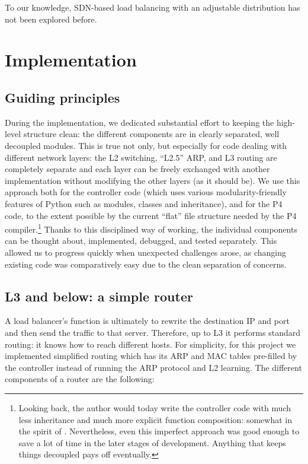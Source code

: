 \documentclass[11pt,oneside,a4paper]{article}
\begin{document}
To our knowledge, SDN-based load balancing with an adjustable distribution has
not been explored before.

\section{Implementation}
\subsection{Guiding principles}
During the implementation, we dedicated substantial effort to keeping the
high-level structure clean: the different components are in clearly separated,
well decoupled modules.
This is true not only, but especially for code dealing with different network
layers: the L2 switching, ``L2.5'' ARP, and L3 routing are completely separate and
each layer can be freely exchanged with another implementation without modifying
the other layers (as it should be).
We use this approach both for the controller code (which uses various
modularity-friendly features of Python such as modules, classes and
inheritance), and for the P4 code, to the extent possible by the current
``flat'' file structure needed by the P4 compiler.\footnote{%
Looking back, the author would today write the controller code with much less
inheritance and much more explicit function composition: somewhat in the
spirit of \cite{inheritance}.
Nevertheless, even this imperfect approach was good enough to save a lot of time
in the later stages of development.
Anything that keeps things decoupled pays off eventually.%
}
Thanks to this disciplined way of working, the individual components can be
thought about, implemented, debugged, and tested separately.
This allowed us to progress quickly when unexpected challenges arose, as
changing existing code was comparatively easy due to the clean separation of
concerns.

\subsection{L3 and below: a simple router}
A load balancer's function is ultimately to rewrite the destination IP and port
and then send the traffic to that server.
Therefore, up to L3 it performs standard routing: it knows how to reach
different hosts.
For simplicity, for this project we implemented simplified routing which has its
ARP and MAC tables pre-filled by the controller instead of running the ARP
protocol and L2 learning.
The different components of a router are the following:
\end{document}
